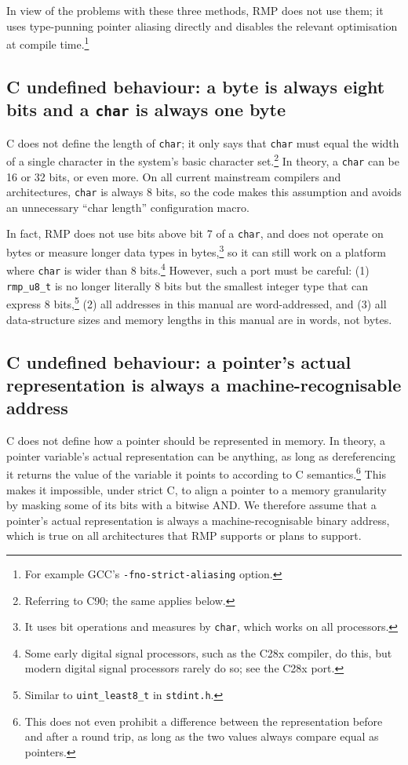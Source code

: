 In view of the problems with these three methods, RMP does not use them; it uses type-punning pointer aliasing directly and disables the relevant optimisation at compile time.\footnote{For example GCC's \texttt{-fno-strict-aliasing} option.}

\subsection{C undefined behaviour: a byte is always eight bits and a \texttt{char} is always one byte}

C does not define the length of \texttt{char}; it only says that \texttt{char} must equal the width of a single character in the system's basic character set.\footnote{Referring to C90; the same applies below.}
In theory, a \texttt{char} can be 16 or 32 bits, or even more.
On all current mainstream compilers and architectures, \texttt{char} is always 8 bits, so the code makes this assumption and avoids an unnecessary ``char length'' configuration macro.

In fact, RMP does not use bits above bit 7 of a \texttt{char}, and does not operate on bytes or measure longer data types in bytes,\footnote{It uses bit operations and measures by \texttt{char}, which works on all processors.} so it can still work on a platform where \texttt{char} is wider than 8 bits.\footnote{Some early digital signal processors, such as the C28x compiler, do this, but modern digital signal processors rarely do so; see the C28x port.}
However, such a port must be careful: (1) \texttt{rmp\_u8\_t} is no longer literally 8 bits but the smallest integer type that can express 8 bits,\footnote{Similar to \texttt{uint\_least8\_t} in \texttt{stdint.h}.} (2) all addresses in this manual are word-addressed, and (3) all data-structure sizes and memory lengths in this manual are in words, not bytes.

\subsection{C undefined behaviour: a pointer's actual representation is always a machine-recognisable address}

C does not define how a pointer should be represented in memory.
In theory, a pointer variable's actual representation can be anything, as long as dereferencing it returns the value of the variable it points to according to C semantics.\footnote{This does not even prohibit a difference between the representation before and after a round trip, as long as the two values always compare equal as pointers.}
This makes it impossible, under strict C, to align a pointer to a memory granularity by masking some of its bits with a bitwise AND.
We therefore assume that a pointer's actual representation is always a machine-recognisable binary address, which is true on all architectures that RMP supports or plans to support.

